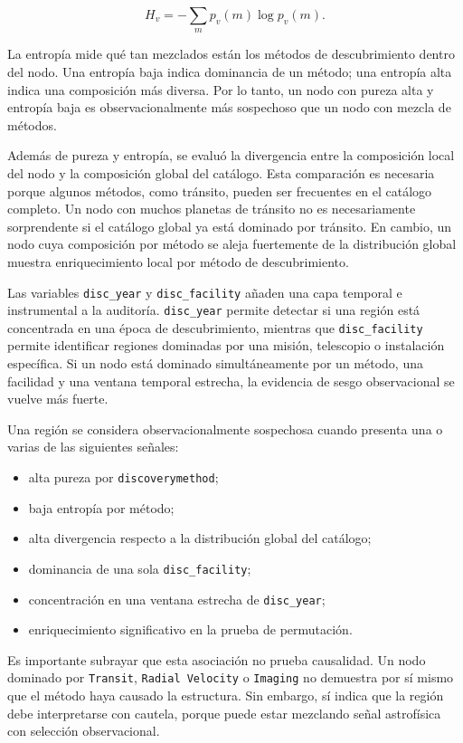 \[
H_v=-\sum_m p_v(m)\log p_v(m).
\]

La entropía mide qué tan mezclados están los métodos de descubrimiento dentro del nodo. Una entropía baja indica dominancia de un método; una entropía alta indica una composición más diversa. Por lo tanto, un nodo con pureza alta y entropía baja es observacionalmente más sospechoso que un nodo con mezcla de métodos.

Además de pureza y entropía, se evaluó la divergencia entre la composición local del nodo y la composición global del catálogo. Esta comparación es necesaria porque algunos métodos, como tránsito, pueden ser frecuentes en el catálogo completo. Un nodo con muchos planetas de tránsito no es necesariamente sorprendente si el catálogo global ya está dominado por tránsito. En cambio, un nodo cuya composición por método se aleja fuertemente de la distribución global muestra enriquecimiento local por método de descubrimiento.

Las variables \texttt{disc\_year} y \texttt{disc\_facility} añaden una capa temporal e instrumental a la auditoría. \texttt{disc\_year} permite detectar si una región está concentrada en una época de descubrimiento, mientras que \texttt{disc\_facility} permite identificar regiones dominadas por una misión, telescopio o instalación específica. Si un nodo está dominado simultáneamente por un método, una facilidad y una ventana temporal estrecha, la evidencia de sesgo observacional se vuelve más fuerte.

Una región se considera observacionalmente sospechosa cuando presenta una o varias de las siguientes señales:

\begin{itemize}
    \item alta pureza por \texttt{discoverymethod};
    \item baja entropía por método;
    \item alta divergencia respecto a la distribución global del catálogo;
    \item dominancia de una sola \texttt{disc\_facility};
    \item concentración en una ventana estrecha de \texttt{disc\_year};
    \item enriquecimiento significativo en la prueba de permutación.
\end{itemize}

Es importante subrayar que esta asociación no prueba causalidad. Un nodo dominado por \texttt{Transit}, \texttt{Radial Velocity} o \texttt{Imaging} no demuestra por sí mismo que el método haya causado la estructura. Sin embargo, sí indica que la región debe interpretarse con cautela, porque puede estar mezclando señal astrofísica con selección observacional.

